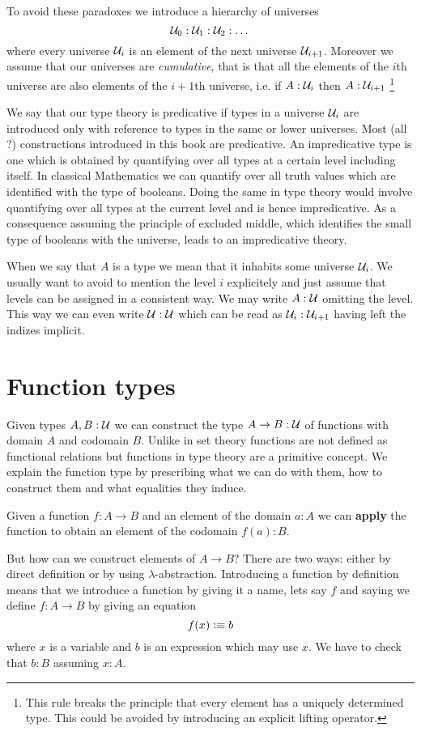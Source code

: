 To avoid these paradoxes we introduce a hierarchy of universes
\[ \mathcal{U}_0 : \mathcal{U}_1 : \mathcal{U}_2 : \dots \]
where every universe $\mathcal{U}_i$ is an element of the next universe
$\mathcal{U}_{i+1}$. Moreover we assume that our universes are
\emph{cumulative}, that is that all the elements of the $i$th
universe are also elements of the $i+1$th universe, i.e. if
$A:\mathcal{U}_i$ then $A:\mathcal{U}_{i+1}$
\footnote{This rule breaks the principle that every element
  has a uniquely determined type. This could be avoided by introducing
  an explicit lifting operator.}

We say that our type theory is predicative if types in a universe $\mathcal{U}_i$ are introduced only with reference to types in the same or lower universes. Most (all ?) constructions introduced in this book are predicative. An impredicative type is one which is obtained by quantifying over all types at a certain level including itself. In classical Mathematics we can quantify over all truth values which are identified with the type of booleans. Doing the same in type theory would involve quantifying over all types at the current level and is hence impredicative. As a consequence assuming the principle of excluded middle, which identifies the small type of booleans with the universe, leads to an impredicative theory.

When we say that $A$ is a type we mean that it inhabits some universe
$\mathcal{U}_i$. We usually want to avoid to mention the level $i$ explicitely
and just assume that levels can be assigned in a consistent way. We
may write $A:\mathcal{U}$ omitting the level. This way we can even write
$\mathcal{U}:\mathcal{U}$ which can be read as $\mathcal{U}_i:\mathcal{U}_{i+1}$ having left the
indizes implicit. 

\section{Function types}
\label{sec:function-types}

Given types $A,B :\mathcal{U}$ we can construct the type $A \to B:\mathcal{U}$ of functions with domain $A$
and codomain $B$. Unlike in set theory functions are not defined as
functional relations but functions in type theory are a primitive
concept. We explain the function type by prescribing what we can do with them, 
how to construct them and what equalities they induce.

Given a function $f : A \to B$ and an element of the domain $a : A$ we
can \textbf{apply} the function to obtain an element of the codomain
$f(a) : B$. 

But how can we construct elements of $A \to B$? There are two ways:
either by direct definition or by using
$\lambda$-abstraction. Introducing a function by definition means that
we introduce a function by giving it a name, lets say $f$ and saying
we define $f : A \to B$ by giving an equation
\[ f(x) \vcentcolon\equiv b \]
where $x$ is a variable and $b$ is an expression which may use $x$.
We have to check that $b : B$ assuming $x:A$.

